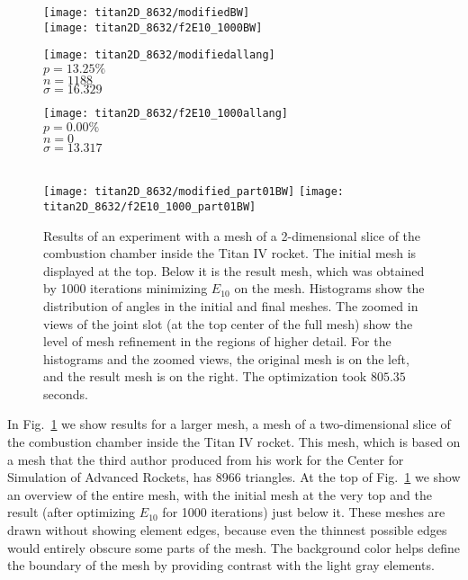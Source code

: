 \documentclass[final]{siamltex}
\begin{document}
\begin{figure}
  \centering
  \texttt{[image: titan2D\_8632/modifiedBW]}\\
  \texttt{[image: titan2D\_8632/f2E10\_1000BW]}\\[7pt]
  \begin{minipage}{80pt}
  \centering
  \texttt{[image: titan2D\_8632/modifiedallang]}\\
  {\small $p = 13.25\%$\\
  $n = 1188$\\
  $\sigma = 16.329$}
  \end{minipage}\hspace{210pt}\begin{minipage}{80pt}
  \centering
  \texttt{[image: titan2D\_8632/f2E10\_1000allang]}\\
  {\small $p = 0.00\%$\\
  $n = 0$\\
  $\sigma = 13.317$}
  \end{minipage}\\[-106pt]
  \texttt{[image: titan2D\_8632/modified\_part01BW]}
  \hspace{7pt}\texttt{[image: titan2D\_8632/f2E10\_1000\_part01BW]}\caption{Results of an experiment with a mesh of a 2-dimensional
    slice of the combustion chamber inside the Titan IV rocket.  The
    initial mesh is displayed at the top.  Below it is the result
    mesh, which was obtained by 1000 iterations minimizing $E_{10}$ on
    the mesh.  Histograms show the distribution of angles in the
    initial and final meshes.  The zoomed in views of the joint slot
    (at the top center of the full mesh) show the level of mesh
    refinement in the regions of higher detail.  For the histograms
    and the zoomed views, the original mesh is on the left, and the
    result mesh is on the right.  The optimization took $805.35$
    seconds.}
\label{fig:titan2D}
\end{figure}

In Fig.~\ref{fig:titan2D} we show results for a larger mesh, a
mesh of a two-dimensional slice of the combustion chamber inside the
Titan IV rocket.  This mesh, which is based on a mesh that the third
author produced from his work for the Center for Simulation of
Advanced Rockets, has 8966 triangles.  At the top of
Fig.~\ref{fig:titan2D} we show an overview of the entire mesh, with
the initial mesh at the very top and the result (after optimizing
$E_{10}$ for 1000 iterations) just below it.  These meshes are drawn
without showing element edges, because even the thinnest possible
edges would entirely obscure some parts of the mesh.
The background color helps define the boundary of the mesh by
providing contrast with the light gray elements.
\end{document}
